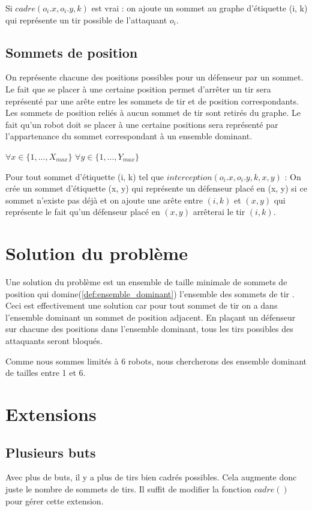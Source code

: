 \documentclass[12pt]{article}
\begin{document}
Si $cadre(o_i.x, o_i.y, k)$ est vrai : on ajoute un sommet au graphe d'étiquette (i, k) qui représente un tir possible de l'attaquant $o_i$. \bigbreak

\subsection{Sommets de position}
On représente chacune des positions possibles pour un défenseur par un sommet.
Le fait que se placer à une certaine position permet d'arrêter un tir sera représenté par une arête entre les sommets de tir et de position correspondants.
Les sommets de position reliés à aucun sommet de tir sont retirés du graphe.
Le fait qu'un robot doit se placer à une certaine positions sera représenté par l'appartenance du sommet correspondant à un ensemble dominant.
\newline

$\forall x \in \{1, ..., X_{max}\}$ $\forall y \in \{1, ..., Y_{max}\}$ 

Pour tout sommet d'étiquette (i, k) tel que $interception(o_i.x, o_i.y, k, x, y)$ : On crée un sommet d'étiquette (x, y) qui représente un défenseur placé en (x, y) si ce sommet n'existe pas déjà et on ajoute une arête entre $(i, k)$ et $(x, y)$ qui représente le fait qu'un défenseur placé en $(x, y)$ arrêterai le tir $(i, k)$.

\section{Solution du problème}
Une solution du problème est un ensemble de taille minimale de sommets de position qui domine(\ref{def:ensemble_dominant}) l'ensemble des sommets de tir . Ceci est effectivement une solution car pour tout sommet de tir on a dans l'ensemble dominant un sommet de position adjacent. En plaçant un défenseur sur chacune des positions dans l'ensemble dominant, tous les tirs possibles des attaquants seront bloqués.

Comme nous sommes limités à 6 robots, nous chercherons des ensemble dominant de tailles entre 1 et 6.

\section{Extensions}
\subsection{Plusieurs buts}
Avec plus de buts, il y a plus de tirs bien cadrés possibles. Cela augmente donc juste le nombre de sommets de tirs. Il suffit de modifier la fonction $cadre()$ pour gérer cette extension.
\end{document}
